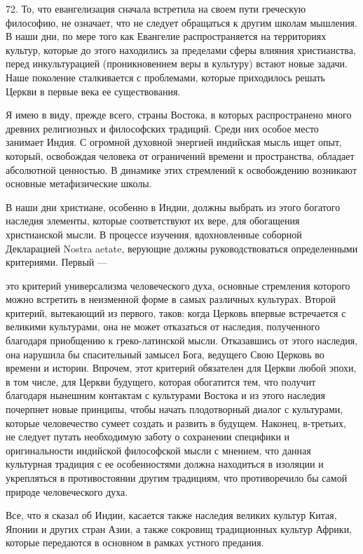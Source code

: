 \documentclass[a5paper,10pt]{article}
\begin{document}
72. То, что евангелизация сначала встретила на своем пути греческую философию,
не означает, что не следует обращаться к другим школам мышления. В наши дни, по
мере того как Евангелие распространяется на территориях культур, которые до
этого находились за пределами сферы влияния христианства, перед инкультурацией
(проникновением веры в культуру) встают новые задачи. Наше поколение
сталкивается с проблемами, которые приходилось решать Церкви в первые века ее
существования.

Я имею в виду, прежде всего, страны Востока, в которых распространено много
древних религиозных и философских традиций. Среди них особое место занимает
Индия. С огромной духовной энергией индийская мысль ищет опыт, который,
освобождая человека от ограничений времени и пространства, обладает абсолютной
ценностью. В динамике этих стремлений к освобождению возникают основные
метафизические школы.

В наши дни христиане, особенно в Индии, должны выбрать из этого богатого
наследия элементы, которые соответствуют их вере, для обогащения христианской
мысли. В процессе изучения, вдохновленные соборной Декларацией Nostra aetate,
верующие должны руководствоваться определенными критериями. Первый —

это критерий универсализма человеческого духа, основные стремления которого
можно встретить в неизменной форме в самых различных культурах. Второй
критерий, вытекающий из первого, таков: когда Церковь впервые встречается с
великими культурами, она не может отказаться от наследия, полученного благодаря
приобщению к греко-латинской мысли. Отказавшись от этого наследия, она нарушила
бы спасительный замысел Бога, ведущего Свою Церковь во времени и истории.
Впрочем, этот критерий обязателен для Церкви любой эпохи, в том числе, для
Церкви будущего, которая обогатится тем, что получит благодаря нынешним
контактам с культурами Востока и из этого наследия почерпнет новые принципы,
чтобы начать плодотворный диалог с культурами, которые человечество сумеет
создать и развить в будущем. Наконец, в-третьих, не следует путать необходимую
заботу о сохранении специфики и оригинальности индийской философской мысли с
мнением, что данная культурная традиция с ее особенностями должна находиться в
изоляции и укрепляться в противостоянии другим традициям, что противоречило бы
самой природе человеческого духа.

Все, что я сказал об Индии, касается также наследия великих культур Китая,
Японии и других стран Азии, а также сокровищ традиционных культур Африки,
которые передаются в основном в рамках устного предания.
\end{document}
